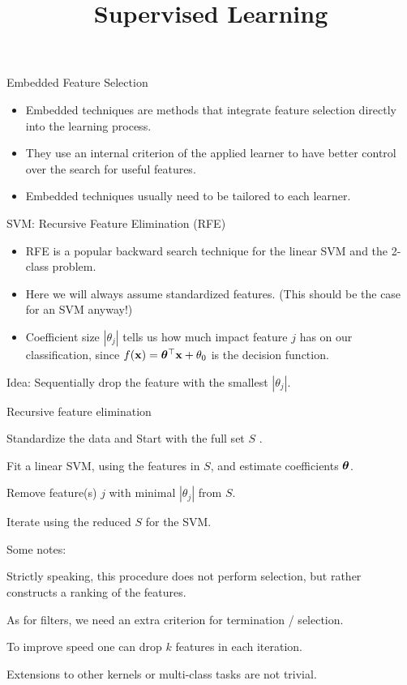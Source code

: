 \documentclass[11pt,compress,t,notes=noshow, xcolor=table]{beamer}
\title{Supervised Learning}
\date{}
\begin{document}

  \begin{vbframe}{Embedded Feature Selection}

    \begin{itemize}
      \item Embedded techniques are methods that integrate feature selection directly into the learning process.
      \item They use an internal criterion of the applied learner to have better control over the search for useful features.
      \item Embedded techniques usually need to be tailored to each learner.
    \end{itemize}
      
  \end{vbframe}

  \begin{vbframe}{SVM: Recursive Feature Elimination (RFE)}
    \begin{itemize}
      \item RFE is a popular backward search technique for the linear SVM and the 2-class problem.
      \item Here we will always assume standardized features. (This should be the case for an SVM anyway!)
      \item Coefficient size $|\theta_j|$ tells us how much impact feature $j$ has on our classification,
      since $f(\mathbf{x}) = \bm{\theta}^\top \mathbf{x} + \theta_0$ is the decision function.
    \end{itemize}

    Idea: Sequentially drop the feature with the smallest $|\theta_j|$.




    \framebreak

    \begin{blocki}{Recursive feature elimination}
      \item Standardize the data and Start with the full set $S$ .
      \item Fit a linear SVM, using the features in $S$, and estimate coefficients $\bm{\theta}$.
      \item Remove feature(s) $j$ with minimal $|\theta_j|$ from $S$.
      \item Iterate  using the reduced $S$ for the SVM.
    \end{blocki}

    \begin{blocki}{Some notes:}
      \item Strictly speaking, this procedure does not perform selection, but rather constructs a ranking of the features.
      \item As for filters, we need an extra criterion for termination / selection.
      \item To improve speed one can drop $k$ features in each iteration.
      \item Extensions to other kernels or multi-class tasks are not trivial.
    \end{blocki}


  \end{vbframe}
\end{document}
